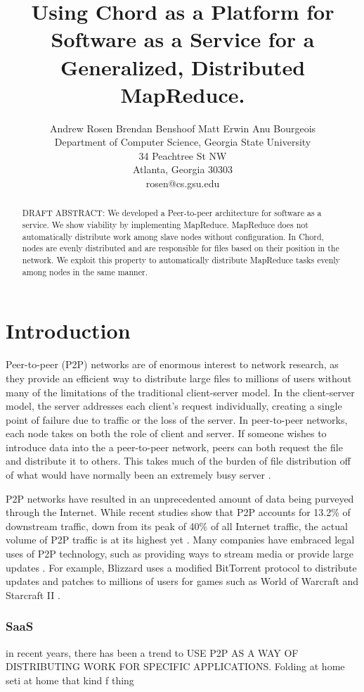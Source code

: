 \documentclass[conference, compsocconf, letterpaper]{IEEEtran}
\title{Using Chord as a Platform for Software as a Service for a Generalized, Distributed MapReduce.}
\author{
Andrew Rosen \qquad Brendan Benshoof \qquad Matt Erwin \qquad Anu Bourgeois  \\Department of Computer Science, Georgia State University\\ 34 Peachtree St NW \\ Atlanta, Georgia 30303\\  rosen@cs.gsu.edu }
\begin{document}
\maketitle

\begin{abstract}
DRAFT ABSTRACT:  We developed a Peer-to-peer architecture for software as a service. We show viability by implementing MapReduce.
MapReduce does not automatically distribute work among slave nodes without configuration.  In Chord, nodes are evenly distributed and  are responsible for files based on their position in the network. We exploit this property to automatically distribute MapReduce tasks evenly among nodes in the same manner. 
\end{abstract}


\section{Introduction}


Peer-to-peer (P2P) networks are of enormous interest to network research, as they provide an efficient way to distribute large files to millions of users without many of the limitations of the traditional client-server model. In the client-server model, the server addresses each client's request individually, creating a single point of failure due to traffic or the loss of the server.  In peer-to-peer networks, each node takes on both the role of client and server.  If someone wishes to introduce data into the a peer-to-peer network, peers can both request the file and distribute it to others.  This takes much of the burden of file distribution off of what would have normally been an extremely busy server \cite{Overview}.  

P2P networks have resulted in an unprecedented amount of data being purveyed through the Internet.  While recent studies show that P2P accounts for 13.2\% of downstream traffic, down from its peak of 40\% of all Internet traffic, the actual volume of P2P traffic is at its highest yet \cite{5713296}. Many companies have embraced legal uses of P2P technology, such as providing ways to stream media or provide large updates  \cite{P2PLegal}.  For example, Blizzard uses a modified BitTorrent protocol to distribute updates and patches to millions of users for games such as World of Warcraft and Starcraft II \cite{chehai2006analysis}.



\subsubsection{SaaS}
in recent years, there has been a trend to USE P2P AS A WAY OF DISTRIBUTING WORK FOR SPECIFIC APPLICATIONS.  Folding at home seti at home that kind f thing
\end{document}
